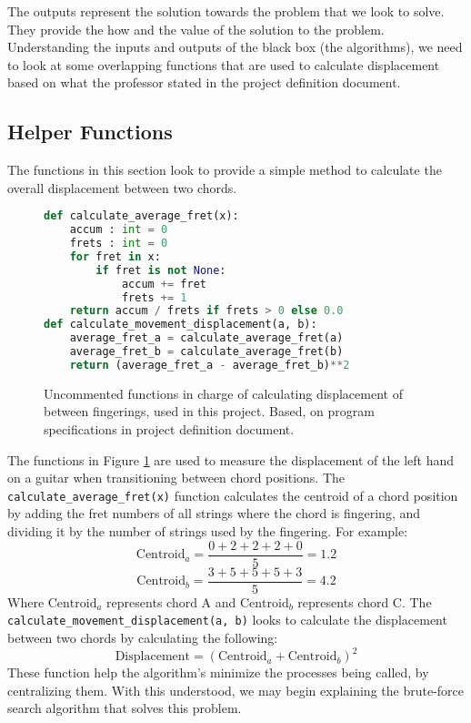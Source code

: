 \documentclass[conference]{IEEEtran}
\begin{document}
\indent The outputs represent the solution towards the problem that we look to solve. They provide the how and the value of the solution to the problem.
\newline
\indent Understanding the inputs and outputs of the black box (the algorithms), we need to look at some overlapping functions that are used to calculate displacement based on what the professor stated in the project definition document.
\subsection{Helper Functions}
The functions in this section look to provide a simple method to calculate the overall displacement between two chords. 
\begin{figure}[H]
\begin{lstlisting}[language=Python]
def calculate_average_fret(x):
    accum : int = 0
    frets : int = 0
    for fret in x:
        if fret is not None:
            accum += fret
            frets += 1
    return accum / frets if frets > 0 else 0.0
def calculate_movement_displacement(a, b):
    average_fret_a = calculate_average_fret(a)
    average_fret_b = calculate_average_fret(b)
    return (average_fret_a - average_fret_b)**2    
\end{lstlisting}
\caption{Uncommented functions in charge of calculating displacement of between fingerings, used in this project. Based, on program specifications in project definition document.}
\label{fig:DisplacementFunctions}
\end{figure}
The functions in Figure \ref{fig:DisplacementFunctions} are used to measure the displacement of the left hand on a guitar when transitioning between chord positions. The \lstinline|calculate_average_fret(x)| function calculates the centroid of a chord position by adding the fret numbers of all strings where the chord is fingering, and dividing it by the number of strings used by the fingering. For example: 
\[
\text{Centroid}_a  = \frac{0+2+2+2+0}{5} = 1.2 
\] 
\[
\text{Centroid}_b = \frac{3+5+5+5+3}{5} = 4.2 
\]
\indent Where \( \text{Centroid}_a \) represents chord A and \(\text{Centroid}_b \) represents chord C. 
\newline 
\indent The \lstinline|calculate_movement_displacement(a, b)| looks to calculate the displacement between two chords by calculating the following:
\[
\text{Displacement} = (\text{Centroid}_a + \text{Centroid}_b)^2
\]
\indent These function help the algorithm's minimize the processes being called, by centralizing them. With this understood, we may begin explaining the brute-force search algorithm that solves this problem.
\end{document}
